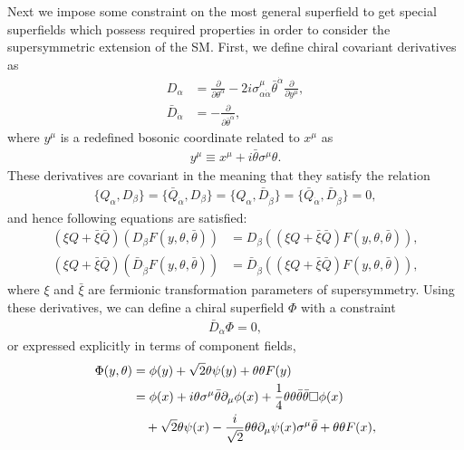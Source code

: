 \documentclass[12pt,twoside,book]{article}
\begin{document}
Next we impose some constraint on the most general superfield to get
special superfields which possess required properties in order to
consider the supersymmetric extension of the SM.  First, we define
chiral covariant derivatives as
\begin{align}
 D_\alpha &= \frac{\partial}{\partial \theta^\alpha} -
 2i\sigma^\mu_{\alpha \dot{\alpha}} \bar{\theta}^{\dot{\alpha}}
 \frac{\partial}{\partial y^\mu}, \\
 \bar{D}_{\dot{\alpha}} &= - \frac{\partial}{\partial
 \bar{\theta}^{\dot{\alpha}}},
\end{align}
where $y^\mu$ is a redefined bosonic coordinate related to $x^\mu$ as
\begin{align}
 y^\mu \equiv x^\mu + i\bar{\theta} \sigma^\mu \theta.
\end{align}
These derivatives are covariant in the meaning that they satisfy the
relation
\begin{align}
 \{ Q_\alpha, D_\beta \} = \{ \bar{Q}_{\dot{\alpha}}, D_\beta \} = \{
 Q_\alpha, \bar{D}_{\dot{\beta}} \} = \{ \bar{Q}_{\dot{\alpha}},
 \bar{D}_{\dot{\beta}} \} = 0,
\end{align}
and hence following equations are satisfied:
\begin{align}
 (\xi Q + \bar{\xi} \bar{Q}) (D_\beta F(y,\theta,\bar{\theta})) &=
 D_\beta ((\xi Q + \bar{\xi} \bar{Q}) F(y,\theta,\bar{\theta})), \\
 (\xi Q + \bar{\xi} \bar{Q}) (\bar{D}_{\dot{\beta}}
 F(y,\theta,\bar{\theta})) &= \bar{D}_{\dot{\beta}} ((\xi Q +
 \bar{\xi} \bar{Q}) F(y,\theta,\bar{\theta})),
\end{align}
where $\xi$ and $\bar{\xi}$ are fermionic transformation parameters of
supersymmetry.  Using these derivatives, we can define a chiral
superfield $\Phi$ with a constraint
\begin{align}
 \bar{D}_{\dot{\alpha}} \Phi = 0,
\end{align}
or expressed explicitly in terms of component fields,
\begin{align}
 \Phi(y,\theta) &= \phi(y) + \sqrt{2} \theta \psi(y) +
 \theta\theta F(y) \notag \\
 &=  \phi(x) + i\theta \sigma^\mu \bar{\theta} \partial_\mu \phi(x) +
 \frac{1}{4} \theta\theta\bar{\theta}\bar{\theta} \Box \phi(x) \notag \\
 &\quad + \sqrt{2} \theta \psi(x) - \frac{i}{\sqrt{2}} \theta\theta
 \partial_\mu \psi(x) \sigma^\mu \bar{\theta} + \theta\theta F(x),\label{chiralsuperf}
\end{align}
\end{document}
